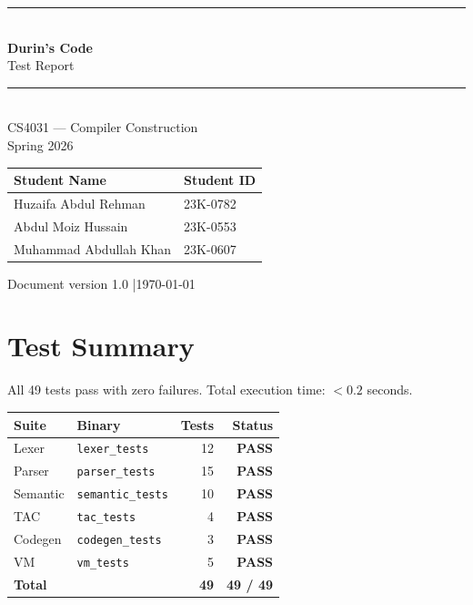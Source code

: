 \documentclass[12pt, a4paper]{article}
\begin{document}
\begin{titlepage}
  \centering
  \vspace*{2cm}
  {\color{durins-blue}\rule{\linewidth}{2pt}}\\[1em]
  {\Huge\bfseries\color{durins-blue} Durin's Code}\\[0.5em]
  {\LARGE\color{durins-gold} Test Report}\\[1em]
  {\color{durins-blue}\rule{\linewidth}{2pt}}\\[2em]

  {\large CS4031 --- Compiler Construction \\ Spring 2026}\\[3em]

  \begin{tabular}{ll}
    \toprule
    \textbf{Student Name} & \textbf{Student ID} \\
    \midrule
    Huzaifa Abdul Rehman   & 23K-0782 \\
    Abdul Moiz Hussain     & 23K-0553 \\
    Muhammad Abdullah Khan & 23K-0607 \\
    \bottomrule
  \end{tabular}

  \vfill
  {\small\color{durins-gray} Document version 1.0 \quad|\quad \today}
\end{titlepage}

\tableofcontents
\newpage

\section{Test Summary}

All 49 tests pass with zero failures.
Total execution time: $<0.2$ seconds.

\begin{center}
\begin{tabular}{llrr}
\toprule
\textbf{Suite} & \textbf{Binary} & \textbf{Tests} & \textbf{Status} \\
\midrule
Lexer    & \texttt{lexer\_tests}    & 12 & \textcolor{code-cmt}{\textbf{PASS}} \\
Parser   & \texttt{parser\_tests}   & 15 & \textcolor{code-cmt}{\textbf{PASS}} \\
Semantic & \texttt{semantic\_tests} & 10 & \textcolor{code-cmt}{\textbf{PASS}} \\
TAC      & \texttt{tac\_tests}      &  4 & \textcolor{code-cmt}{\textbf{PASS}} \\
Codegen  & \texttt{codegen\_tests}  &  3 & \textcolor{code-cmt}{\textbf{PASS}} \\
VM       & \texttt{vm\_tests}       &  5 & \textcolor{code-cmt}{\textbf{PASS}} \\
\midrule
\textbf{Total} & & \textbf{49} & \textcolor{code-cmt}{\textbf{49 / 49}} \\
\bottomrule
\end{tabular}
\end{center}
\end{document}
